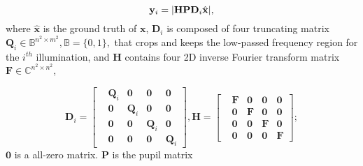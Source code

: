 \documentclass{article}
\DeclarePairedDelimiter\abs{\lvert}{\rvert}%
\providecommand{\vx}{\mathbf{x}}
\providecommand{\vy}{\mathbf{y}}
\providecommand{\vp}{\mathbf{p}}
\providecommand{\mD}{\mathbf{D}}
\providecommand{\mF}{\mathbf{F}}
\providecommand{\mP}{\mathbf{P}}
\providecommand{\mH}{\mathbf{H}}
\providecommand{\mQ}{\mathbf{Q}}
\providecommand{\C}{\ensuremath{\mathbb{C}}}
\providecommand{\B}{\ensuremath{\mathbb{B}}}
\begin{document}
\begin{equation}
\vy_i = \abs{\mH\mP\mD_i\hat{\vx}},
\end{equation}
where $\hat{\vx}$ is the ground truth of $\vx$, $\mD_i$ is composed of four truncating matrix $\mQ_i\in \B^{n^2\times m^2}, \B=\{0,1\},$ that crops and keeps the low-passed frequency region for the $i^{th}$ illumination, and $\mH$ contains four 2D inverse Fourier transform matrix $\mF\in\C^{n^2\times n^2}$,
\newcommand\bigzero{\makebox(0,0){\text{\huge0}}}
\newcommand{\Dmatrix}{
  \begin{bmatrix}
   &\mQ_i &\mathbf{0} &\mathbf{0} &\mathbf{0} \\
   &\mathbf{0}  &\mQ_i &\mathbf{0} &\mathbf{0} \\
   &\mathbf{0} &\mathbf{0} &\mQ_i &\mathbf{0} \\
   &\mathbf{0} &\mathbf{0} &\mathbf{0} &\mQ_i
   \end{bmatrix}}
   
\newcommand{\Hmatrix}{
  \begin{bmatrix}
   &\mF &\mathbf{0} &\mathbf{0} &\mathbf{0} \\
   &\mathbf{0}  &\mF &\mathbf{0} &\mathbf{0} \\
   &\mathbf{0} &\mathbf{0} &\mF &\mathbf{0} \\
   &\mathbf{0} &\mathbf{0} &\mathbf{0} &\mF
   \end{bmatrix}}
  
\begin{equation}
   \mD_i = \Dmatrix, \mH = \Hmatrix;
\end{equation}
$\mathbf{0}$ is a all-zero matrix. $\mP$ is the pupil matrix
\providecommand{\diag}{\text{Diag}}
\newcommand{\PPmatrix}{
  \begin{bmatrix}
   &\diag(\vp_1) &\mathbf{0} &\diag(\vp_2) &\mathbf{0} \\
   &\mathbf{0} &\diag(\vp_3) &\mathbf{0} &\diag(\vp_4) \\
   &\diag(\vp_1) &\diag(\vp_1) &\diag(\vp_2) &\diag(\vp_2) \\
   &\diag(\vp_3) &\diag(\vp_3) &\diag(\vp_4) &\diag(\vp_4) 
   \end{bmatrix}}
\end{document}
